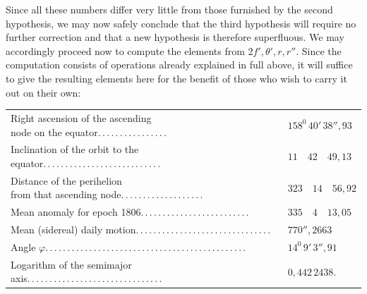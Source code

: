 Since all these numbers differ very little from those furnished by the second hypothesis, we may now safely conclude that the third hypothesis will require no further correction and that a new hypothesis is therefore superfluous. We may accordingly proceed now to compute the elements from $2f',\theta',r,r''$. Since the computation consists of operations already explained in full above, it will suffice to give the resulting elements here for the benefit of those who wish to carry it out on their own:
\begin{center}\begingroup\footnotesize\setlength{\tabcolsep}{3pt}\renewcommand{\arraystretch}{1.3}
\begin{tabular}{ll}
\shortstack[l]{Right ascension of the ascending\\node on the equator\quad .\,.\,.\,.\,.\,.\,.\,.\,.\,.\,.\,.\,.\,.\,.\,.} & $158^0\,40'\,38''{,}93$\\
Inclination of the orbit to the equator\quad .\,.\,.\,.\,.\,.\,.\,.\,.\,.\,.\,.\,.\,.\,.\,.\,.\,.\,.\,.\,.\,.\,.\,.\,.\,.\,. & $11\quad42\quad49{,}13$\\
\shortstack[l]{Distance of the perihelion\\from that ascending node\quad .\,.\,.\,.\,.\,.\,.\,.\,.\,.\,.\,.\,.\,.\,.\,.\,.\,.\,.} & $323\quad14\quad56{,}92$\\
Mean anomaly for epoch 1806\quad .\,.\,.\,.\,.\,.\,.\,.\,.\,.\,.\,.\,.\,.\,.\,.\,.\,.\,.\,.\,.\,.\,.\,.\,. & $335\quad4\quad13{,}05$\\
Mean (sidereal) daily motion\quad .\,.\,.\,.\,.\,.\,.\,.\,.\,.\,.\,.\,.\,.\,.\,.\,.\,.\,.\,.\,.\,.\,.\,.\,.\,.\,.\,.\,.\,.\,. & $770''{,}2663$\\
Angle $\varphi$\quad .\,.\,.\,.\,.\,.\,.\,.\,.\,.\,.\,.\,.\,.\,.\,.\,.\,.\,.\,.\,.\,.\,.\,.\,.\,.\,.\,.\,.\,.\,.\,.\,.\,.\,.\,.\,.\,.\,.\,.\,.\,.\,.\,.\,.\,. & $14^0\,9'\,3''{,}91$\\
Logarithm of the semimajor axis\quad .\,.\,.\,.\,.\,.\,.\,.\,.\,.\,.\,.\,.\,.\,.\,.\,.\,.\,.\,.\,.\,.\,.\,.\,.\,.\,.\,.\,.\,.\,. & $0{,}442\,2438$.
\end{tabular}\endgroup\end{center}
